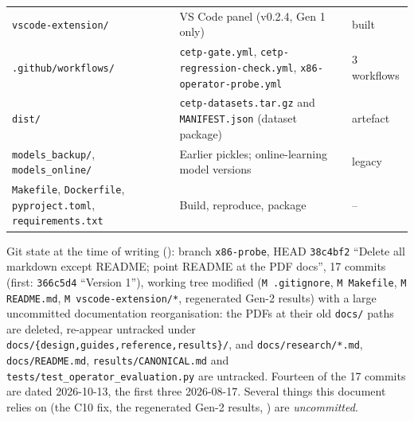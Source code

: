 \begin{center}
\begin{longtable}{@{}L{3.1cm}L{9.4cm}L{2.2cm}@{}}
\texttt{vscode-extension/} & VS Code panel (v0.2.4, Gen 1 only) & built\\
\texttt{.github/workflows/} & \texttt{cetp-gate.yml}, \texttt{cetp-regression-check.yml}, \texttt{x86-operator-probe.yml} & 3 workflows\\
\texttt{dist/} & \texttt{cetp-datasets.tar.gz} and \texttt{MANIFEST.json} (dataset package) & artefact\\
\texttt{models\_backup/}, \texttt{models\_online/} & Earlier pickles; online-learning model versions & legacy\\
\texttt{Makefile}, \texttt{Dockerfile}, \texttt{pyproject.toml}, \texttt{requirements.txt} & Build, reproduce, package & --\\
\bottomrule
\end{longtable}
\end{center}

\begin{notebox}
Git state at the time of writing (\evRUN): branch \texttt{x86-probe}, HEAD \texttt{38c4bf2} ``Delete all
markdown except README; point README at the PDF docs'', 17 commits (first: \texttt{366c5d4} ``Version 1''),
working tree modified (\texttt{M .gitignore}, \texttt{M Makefile}, \texttt{M README.md}, \texttt{M vscode-extension/*}, regenerated Gen-2 results) with a large uncommitted documentation reorganisation: the PDFs at their old \texttt{docs/} paths are deleted, re-appear untracked under \texttt{docs/\{design,guides,reference,results\}/}, and \texttt{docs/research/*.md}, \texttt{docs/README.md}, \texttt{results/CANONICAL.md} and \texttt{tests/test\_operator\_evaluation.py} are untracked. Fourteen of the 17 commits are dated 2026-10-13, the first three 2026-08-17. Several things this document relies on (the C10 fix, the
regenerated Gen-2 results, ) are \emph{uncommitted}.
\end{notebox}

